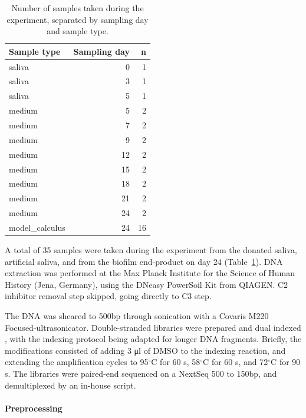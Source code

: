 \documentclass[10pt,a4paper]{article}
\begin{document}
\begin{longtable}[]{@{}lrr@{}}

\caption{\label{tbl-dna-samples}Number of samples taken during the
experiment, separated by sampling day and sample type.}

\tabularnewline

\toprule\noalign{}
Sample type & Sampling day & n \\
\midrule\noalign{}
\endhead
\bottomrule\noalign{}
\endlastfoot
saliva & 0 & 1 \\
saliva & 3 & 1 \\
saliva & 5 & 1 \\
medium & 5 & 2 \\
medium & 7 & 2 \\
medium & 9 & 2 \\
medium & 12 & 2 \\
medium & 15 & 2 \\
medium & 18 & 2 \\
medium & 21 & 2 \\
medium & 24 & 2 \\
model\_calculus & 24 & 16 \\

\end{longtable}

A total of 35 samples were taken during the experiment from the donated
saliva, artificial saliva, and from the biofilm end-product on day 24
(Table~\ref{tbl-dna-samples}). DNA extraction was performed at the Max
Planck Institute for the Science of Human History (Jena, Germany), using
the DNeasy PowerSoil Kit from QIAGEN. C2 inhibitor removal step skipped,
going directly to C3 step.

The DNA was sheared to 500bp through sonication with a Covaris M220
Focused-ultrasonicator. Double-stranded libraries were prepared
\citep{aronHalfUDG2020} and dual indexed
\citep{stahlDoublestrandedIndexing2019}, with the indexing protocol
being adapted for longer DNA fragments. Briefly, the modifications
consisted of adding 3 μl of DMSO to the indexing reaction, and extending
the amplification cycles to 95\(^{\circ}\)C for 60 s, 58\(^{\circ}\)C
for 60 s, and 72\(^{\circ}\)C for 90 s. The libraries were paired-end
sequenced on a NextSeq 500 to 150bp, and demultiplexed by an in-house
script.

\paragraph{Preprocessing}\label{preprocessing}
\end{document}
